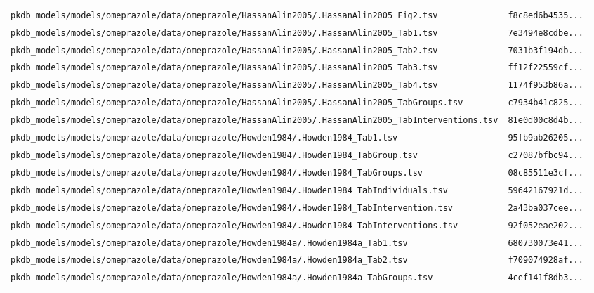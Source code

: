 \begin{longtable}{ll}
\texttt{pkdb\_models/models/omeprazole/data/omeprazole/HassanAlin2005/.HassanAlin2005\_Fig2.tsv} & \texttt{f8c8ed6b4535...} \\
\texttt{pkdb\_models/models/omeprazole/data/omeprazole/HassanAlin2005/.HassanAlin2005\_Tab1.tsv} & \texttt{7e3494e8cdbe...} \\
\texttt{pkdb\_models/models/omeprazole/data/omeprazole/HassanAlin2005/.HassanAlin2005\_Tab2.tsv} & \texttt{7031b3f194db...} \\
\texttt{pkdb\_models/models/omeprazole/data/omeprazole/HassanAlin2005/.HassanAlin2005\_Tab3.tsv} & \texttt{ff12f22559cf...} \\
\texttt{pkdb\_models/models/omeprazole/data/omeprazole/HassanAlin2005/.HassanAlin2005\_Tab4.tsv} & \texttt{1174f953b86a...} \\
\texttt{pkdb\_models/models/omeprazole/data/omeprazole/HassanAlin2005/.HassanAlin2005\_TabGroups.tsv} & \texttt{c7934b41c825...} \\
\texttt{pkdb\_models/models/omeprazole/data/omeprazole/HassanAlin2005/.HassanAlin2005\_TabInterventions.tsv} & \texttt{81e0d00c8d4b...} \\
\texttt{pkdb\_models/models/omeprazole/data/omeprazole/Howden1984/.Howden1984\_Tab1.tsv} & \texttt{95fb9ab26205...} \\
\texttt{pkdb\_models/models/omeprazole/data/omeprazole/Howden1984/.Howden1984\_TabGroup.tsv} & \texttt{c27087bfbc94...} \\
\texttt{pkdb\_models/models/omeprazole/data/omeprazole/Howden1984/.Howden1984\_TabGroups.tsv} & \texttt{08c85511e3cf...} \\
\texttt{pkdb\_models/models/omeprazole/data/omeprazole/Howden1984/.Howden1984\_TabIndividuals.tsv} & \texttt{59642167921d...} \\
\texttt{pkdb\_models/models/omeprazole/data/omeprazole/Howden1984/.Howden1984\_TabIntervention.tsv} & \texttt{2a43ba037cee...} \\
\texttt{pkdb\_models/models/omeprazole/data/omeprazole/Howden1984/.Howden1984\_TabInterventions.tsv} & \texttt{92f052eae202...} \\
\texttt{pkdb\_models/models/omeprazole/data/omeprazole/Howden1984a/.Howden1984a\_Tab1.tsv} & \texttt{680730073e41...} \\
\texttt{pkdb\_models/models/omeprazole/data/omeprazole/Howden1984a/.Howden1984a\_Tab2.tsv} & \texttt{f709074928af...} \\
\texttt{pkdb\_models/models/omeprazole/data/omeprazole/Howden1984a/.Howden1984a\_TabGroups.tsv} & \texttt{4cef141f8db3...} \\

\end{longtable}
